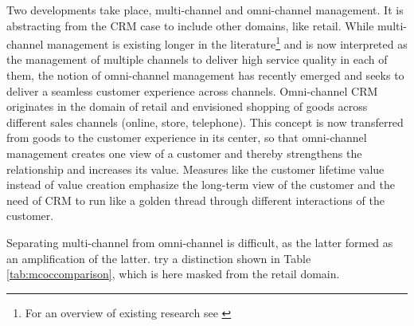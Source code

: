 		Two developments take place, multi-channel and omni-channel management. It is abstracting from the CRM case to include other domains, like retail. While multi-channel management is existing longer in the literature\footnote{For an overview of existing research see \citep{Neslin_2009}} and is now interpreted as the management of multiple channels to deliver high service quality in each of them, the notion of omni-channel management has recently emerged and seeks to deliver a seamless customer experience across channels. Omni-channel CRM originates in the domain of retail \citep{Brynjolfsson20131, rigby2011, Piotrowicz_2014} and envisioned shopping of goods across different sales channels (\ie online, store, telephone). This concept is now transferred from goods to the customer experience in its center, so that omni-channel management creates one view of a customer and thereby strengthens the relationship and increases its value. Measures like the customer lifetime value instead of value creation emphasize the long-term view of the customer \citep{Lemon_2016} and the need of CRM to run like a golden thread through different interactions of the customer. %
		
		Separating multi-channel from omni-channel is difficult, as the latter formed as an amplification of the latter. \cite{vorhoef2015retail} try a distinction shown in Table \ref{tab:mcoccomparison}, which is here masked from the retail domain. 
		
